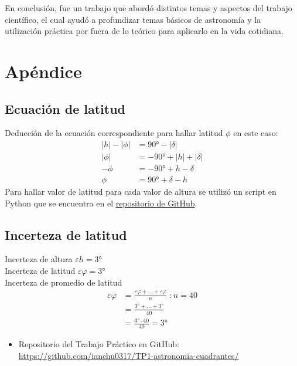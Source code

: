 \documentclass[12pt, a4paper]{article} %
\begin{document}
En conclusión, fue un trabajo que abordó distintos temas y aspectos del trabajo científico, el cual ayudó a profundizar temas básicos de astronomía y la utilización práctica por fuera de lo teórico para aplicarlo en la vida cotidiana.


\section{Apéndice}
\subsection{Ecuación de latitud}
Deducción de la ecuación correspondiente para hallar latitud $\phi$ en este caso:
\begin{align*}
    |h|-|\phi| &= \ang{90}-|\delta| \\
    |\phi| &= -\ang{90}+|h|+|\delta| \\
    -\phi &= -\ang{90} + h - \delta \\
    \phi &= \ang{90} + \delta - h
\end{align*}
Para hallar valor de latitud para cada valor de altura se utilizó un script en Python que se encuentra en el \href{https://github.com/ianchu0317/TP1-astronomia-cuadrantes/tree/main}{repositorio de GitHub}.

\subsection{Incerteza de latitud}
Incerteza de altura $\varepsilon h = \ang{3}$\\[6pt]
Incerteza de latitud $\varepsilon \varphi = \ang{3}$\\[6pt]
Incerteza de promedio de latitud 
\begin{align*}
    \displaystyle \varepsilon \overline{\varphi} &= \frac{\varepsilon \varphi + \dots + \varepsilon \varphi}{n}\,\, : n=40\\[6pt]
    &= \frac{\ang{3} + \dots + \ang{3}}{40}\\[6pt]
    &= \frac{\ang{3} \cdot 40}{40} = \ang{3}
\end{align*}



\vspace{0.5cm}


\begin{itemize}
    \item Repositorio del Trabajo Práctico en GitHub: \url{https://github.com/ianchu0317/TP1-astronomia-cuadrantes/} 
\end{itemize}
\end{document}
